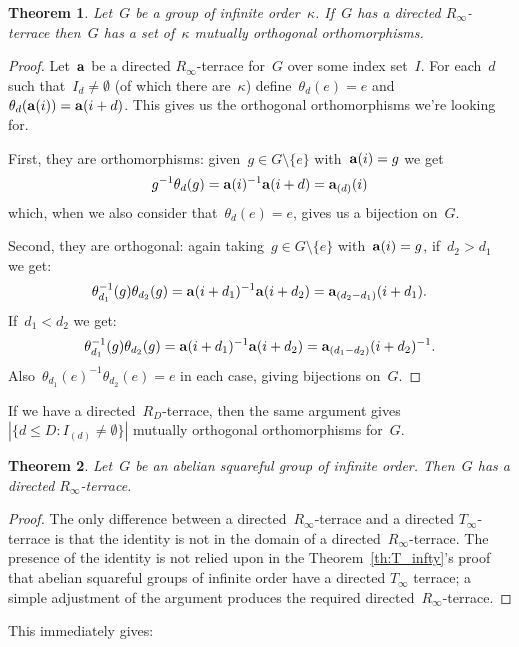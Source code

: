 \documentclass[12pt,a4paper]{article}
\newtheorem{thm}{Theorem}[section]
\begin{document}
\begin{thm}
Let~$G$ be a group of infinite order~$\kappa$.  If~$G$ has a directed $R_{\infty}$-terrace then~$G$ has a set of~$ \kappa$ mutually orthogonal orthomorphisms. 
\end{thm}

\begin{proof}
Let~${\bf a}$ be a directed $R_{\infty}$-terrace for~$G$ over some index set~$I$.  For each~$d$ such that~$I_d \neq \emptyset$ (of which there are~$\kappa$) define~$\theta_d(e) = e$ and $\theta_d( {\bf a}(i) ) = {\bf a}(i+d)$.  This gives us the orthogonal orthomorphisms we're looking for.

First, they are orthomorphisms: given~$g \in G \setminus \{ e \}$ with~${\bf a}(i) = g$ we get
$$g^{-1}\theta_d(g) = {\bf a}(i)^{-1}{\bf a}(i+d) = {\bf a}_{(d)}(i)$$
which, when we also consider that~$\theta_d(e)=e$, gives us a bijection on~$G$.

Second, they are orthogonal: again taking~$g \in G \setminus \{ e \}$ with~${\bf a}(i) = g$, if~$d_2 > d_1$ we get: 
$$\theta_{d_1}^{-1}(g) \theta_{d_2}(g) =  {\bf a}(i+d_1)^{-1}{\bf a}(i+d_2)  = {\bf a}_{(d_2 - d_1)}(i+d_1) .       $$
If~$d_1 < d_2$ we get:
$$\theta_{d_1}^{-1}(g) \theta_{d_2}(g) =  {\bf a}(i+d_1)^{-1}{\bf a}(i+d_2)  = {\bf a}_{(d_1 - d_2)}(i+d_2)^{-1} .       $$
Also~$\theta_{d_1}(e)^{-1}\theta_{d_2}(e) =e$ in each case, giving bijections on~$G$.
\end{proof}

If we have a directed~$R_D$-terrace, then the same argument gives $ | \{ d \leq D : I_{(d)} \neq \emptyset \} |$ mutually orthogonal orthomorphisms for~$G$.

\begin{thm}\label{th:R_infty}
Let~$G$ be an abelian squareful group of infinite order.   Then~$G$ has a directed $R_{\infty}$-terrace.
\end{thm}

\begin{proof}
The only difference between a directed~$R_{\infty}$-terrace and a directed $T_{\infty}$-terrace is that the identity is not in the domain of a directed~$R_{\infty}$-terrace.  The presence of the identity is not relied upon in the Theorem~\ref{th:T_infty}'s proof that abelian squareful groups of infinite order have a  directed $T_{\infty}$ terrace; a simple adjustment of the argument produces the required directed~$R_{\infty}$-terrace.
\end{proof}

This immediately gives:
\end{document}
